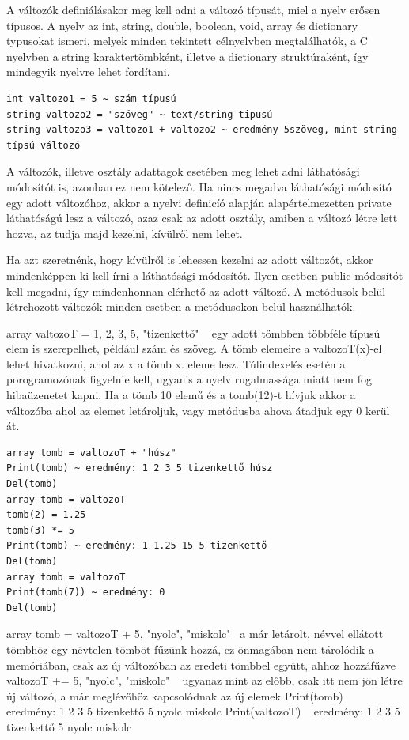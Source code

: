 A változók definiálásakor meg kell adni a változó típusát, miel a nyelv erősen típusos. A nyelv az int, string, double, boolean, void, array és dictionary typusokat ismeri, melyek minden tekintett célnyelvben megtalálhatók, a C nyelvben a string karaktertömbként, illetve a dictionary struktúraként, így mindegyik nyelvre lehet fordítani.

\begin{verbatim}
int valtozo1 = 5 ~ szám típusú
string valtozo2 = "szöveg" ~ text/string tipusú
string valtozo3 = valtozo1 + valtozo2 ~ eredmény 5szöveg, mint string típsú változó
\end{verbatim}

A változók, illetve osztály adattagok esetében meg lehet adni láthatósági módosítót is, azonban ez nem kötelező. Ha nincs megadva láthatósági módosító egy adott változóhoz, akkor a nyelvi definicíó alapján alapértelmezetten private láthatóságú lesz a változó, azaz csak az adott osztály, amiben a változó létre lett hozva, az tudja majd kezelni, kívülről nem lehet.

Ha azt szeretnénk, hogy kívülről is lehessen kezelni az adott változót, akkor mindenképpen ki kell írni a láthatósági módosítót. Ilyen esetben public módosítót kell megadni, így mindenhonnan elérhető az adott változó. A metódusok belül létrehozott változók minden esetben a metódusokon belül használhatók.

array valtozoT = {1, 2, 3, 5, "tizenkettő"} ~ egy adott tömbben többféle típusú elem is szerepelhet, például szám és szöveg. A tömb elemeire a valtozoT(x)-el lehet hivatkozni, ahol az x a tömb x. eleme lesz.
Túlindexelés esetén a porogramozónak figyelnie kell, ugyanis a nyelv rugalmassága miatt nem fog hibaüzenetet kapni. Ha a tömb 10 elemű és a tomb(12)-t hívjuk akkor a változóba ahol az elemet letároljuk, vagy metódusba ahova átadjuk egy 0 kerül át.

\begin{verbatim}
array tomb = valtozoT + "húsz"
Print(tomb) ~ eredmény: 1 2 3 5 tizenkettő húsz
Del(tomb)
array tomb = valtozoT
tomb(2) = 1.25
tomb(3) *= 5
Print(tomb) ~ eredmény: 1 1.25 15 5 tizenkettő
Del(tomb)
array tomb = valtozoT
Print(tomb(7)) ~ eredmény: 0
Del(tomb)
\end{verbatim}

array tomb = valtozoT + {5, "nyolc", "miskolc"} ~a már letárolt, névvel ellátott tömbhöz egy névtelen tömböt fűzünk hozzá, ez önmagában nem tárolódik a memóriában, csak az új változóban az eredeti tömbbel együtt, ahhoz hozzáfűzve
valtozoT += {5, "nyolc", "miskolc"} ~ ugyanaz mint az előbb, csak itt nem jön létre új változó, a már meglévőhöz kapcsolódnak az új elemek
Print(tomb) ~ eredmény: 1 2 3 5 tizenkettő 5 nyolc miskolc
Print(valtozoT) ~ eredmény: 1 2 3 5 tizenkettő 5 nyolc miskolc

